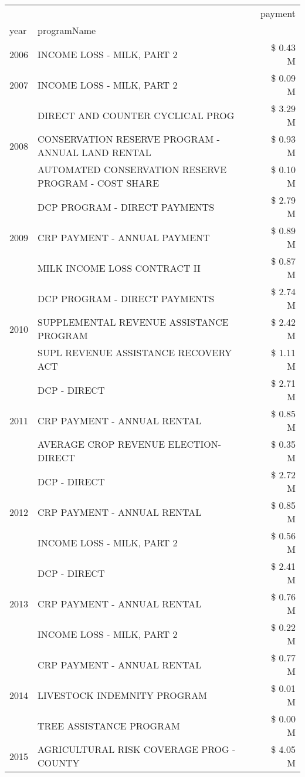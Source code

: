 \begin{tabular}{llr}
\toprule
 &  & payment \\
year & programName &  \\
\midrule
2006 & INCOME LOSS - MILK, PART 2 & \$ 0.43 M \\
\cline{1-3}
2007 & INCOME LOSS - MILK, PART 2 & \$ 0.09 M \\
\cline{1-3}
\multirow[t]{3}{*}{2008} & DIRECT AND COUNTER CYCLICAL PROG & \$ 3.29 M \\
 & CONSERVATION RESERVE PROGRAM - ANNUAL LAND RENTAL & \$ 0.93 M \\
 & AUTOMATED CONSERVATION RESERVE PROGRAM - COST SHARE & \$ 0.10 M \\
\cline{1-3}
\multirow[t]{3}{*}{2009} & DCP PROGRAM - DIRECT PAYMENTS & \$ 2.79 M \\
 & CRP PAYMENT - ANNUAL PAYMENT & \$ 0.89 M \\
 & MILK INCOME LOSS CONTRACT II & \$ 0.87 M \\
\cline{1-3}
\multirow[t]{3}{*}{2010} & DCP PROGRAM - DIRECT PAYMENTS & \$ 2.74 M \\
 & SUPPLEMENTAL REVENUE ASSISTANCE PROGRAM & \$ 2.42 M \\
 & SUPL REVENUE ASSISTANCE RECOVERY ACT & \$ 1.11 M \\
\cline{1-3}
\multirow[t]{3}{*}{2011} & DCP - DIRECT & \$ 2.71 M \\
 & CRP PAYMENT - ANNUAL RENTAL & \$ 0.85 M \\
 & AVERAGE CROP REVENUE ELECTION-DIRECT & \$ 0.35 M \\
\cline{1-3}
\multirow[t]{3}{*}{2012} & DCP - DIRECT & \$ 2.72 M \\
 & CRP PAYMENT - ANNUAL RENTAL & \$ 0.85 M \\
 & INCOME LOSS - MILK, PART 2 & \$ 0.56 M \\
\cline{1-3}
\multirow[t]{3}{*}{2013} & DCP - DIRECT & \$ 2.41 M \\
 & CRP PAYMENT - ANNUAL RENTAL & \$ 0.76 M \\
 & INCOME LOSS - MILK, PART 2 & \$ 0.22 M \\
\cline{1-3}
\multirow[t]{3}{*}{2014} & CRP PAYMENT - ANNUAL RENTAL & \$ 0.77 M \\
 & LIVESTOCK INDEMNITY PROGRAM & \$ 0.01 M \\
 & TREE ASSISTANCE PROGRAM & \$ 0.00 M \\
\cline{1-3}
\multirow[t]{3}{*}{2015} & AGRICULTURAL RISK COVERAGE PROG - COUNTY & \$ 4.05 M \\

\end{tabular}
